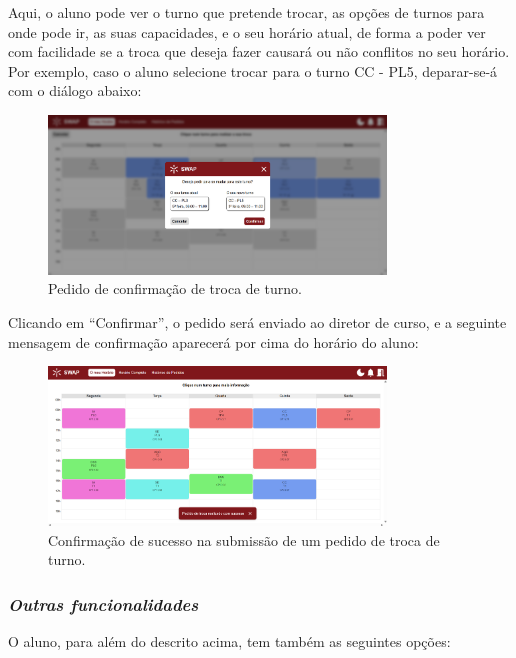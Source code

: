 \documentclass[12pt, a4paper]{article}
\begin{document}
Aqui, o aluno pode ver o turno que pretende trocar, as opções de turnos para onde pode ir, as suas
capacidades, e o seu horário atual, de forma a poder ver com facilidade se a troca que deseja fazer
causará ou não conflitos no seu horário. Por exemplo, caso o aluno selecione trocar para o turno
CC - PL5, deparar-se-á com o diálogo abaixo:

\begin{figure}[H]
    \centering
    \includegraphics[width=0.8\textwidth]{res/manual/popup_pedir_troca.png}
    \caption{Pedido de confirmação de troca de turno.}
    \label{popup_pedir_troca}
\end{figure}

Clicando em ``Confirmar'', o pedido será enviado ao diretor de curso, e a seguinte mensagem de
confirmação aparecerá por cima do horário do aluno:

\begin{figure}[H]
    \centering
    \includegraphics[width=0.8\textwidth]{res/manual/toast_confirmacao_troca.png}
    \caption{Confirmação de sucesso na submissão de um pedido de troca de turno.}
    \label{toast_pedido_troca}
\end{figure}

\subsubsection{\emph{Outras funcionalidades}}

O aluno, para além do descrito acima, tem também as seguintes opções:
\end{document}
